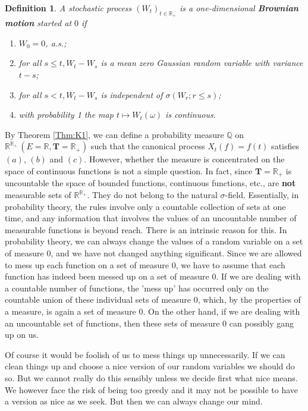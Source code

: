 \documentclass[twoside, 12pt]{book}
\numberwithin{equation}{chapter}
\newtheorem{definition}[theorem]{Definition}
\def\mQ{{\mathbb Q}}
\def\mR{{\mathbb R}}
\def\bT{{\mathbf T}}
\def\leq{\leqslant}
\begin{document}
	\begin{definition}\label{Def:BM}
		A stochastic process $(W_t)_{t\in \mR_+}$ is a one-dimensional {\bf Brownian motion}  started at $0$ if
		\begin{enumerate}
			\item[(a)] $W_0=0$, a.s.;
			\item[(b)] for all $s \leq t, W_t-W_s$ is a mean zero Gaussian random variable with variance $t-s$;
			\item[(c)] for all $s<t, W_t-W_s$ is independent of $\sigma\left(W_r ; r \leq s\right)$;
			\item[(d)] with probability 1 the map $t \mapsto W_t(\omega)$ is continuous.
		\end{enumerate}
	\end{definition}
	By Theorem \ref{Thm:K1}, we can define a probability measure $\mQ$ on $\mR^{\mR_+}\, (E=\mR, \bT=\mR_+)$ such that the canonical process $X_t(f)=f(t)$ satisfies $(a)$, $(b)$ and $(c)$. However, whether the measure is concentrated on the space of continuous functions is not a simple question. In fact, since $\bT=\mR_+$ is uncountable the space of bounded functions, continuous functions, etc., are \textbf{not} measurable sets of $\mR^{\mR_+}$. They do not belong to the natural $\sigma$-field. Essentially, in probability theory, the rules involve only a countable collection of sets at one time, and any information that involves the values of an uncountable number of measurable functions is beyond reach. There is an intrinsic reason for this. In probability theory, we can always change the values of a random variable on a set of measure $0$, and we have not changed anything significant. Since we are allowed to mess up each function on a set of measure $0$, we have to assume that each function has indeed been messed up on a set of measure 0. If we are dealing with a countable number of functions, the 'mess up' has occurred only on the countable union of these individual sets of measure $0$, which, by the properties of a measure, is again a set of measure $0$. On the other hand, if we are dealing with an uncountable set of functions, then these sets of measure $0$ can possibly gang up on us.
	
	Of course it would be foolish of us to mess things up unnecessarily. If we can clean things up and choose a nice version of our random variables we should do so. But we cannot really do this sensibly unless we decide first what nice means. We however face the risk of being too greedy and it may not be possible to have a version as nice as we seek. But then we can always change our mind. 
	
\end{document}
